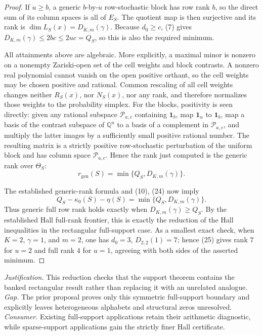 \documentclass{article}
\begin{document}
\begin{proof}
If \(u\ge b\), a generic \(b\)-by-\(u\) row-stochastic block has row rank
\(b\), so the direct sum of its column spaces is all of \(E_S\).  The quotient
map is then surjective and its rank is \(\dim L_S(x)=D_{K,m}(\gamma)\).  Because
\(d_0\ge c\), (7) gives \(D_{K,m}(\gamma)\le2bc\le2uc=Q_S\), so this is also
the required minimum.

All attainments above are algebraic.  More explicitly, a maximal minor is
nonzero on a nonempty Zariski-open set of the cell weights and block contrasts.
A nonzero real polynomial cannot vanish on the open positive orthant, so the
cell weights may be chosen positive and rational.  Common rescaling of all cell
weights changes neither \(R_S(x)\), nor \(N_S(x)\), nor any rank, and therefore
normalizes those weights to the probability simplex.  For the blocks, positivity
is seen directly: given any rational subspace \(\mathscr P_{a,c}\) containing
\(\mathbf 1_b\), map \(\mathbf 1_u\) to \(\mathbf 1_b\), map a basis of the
contrast subspace of \(\mathbb Q^u\) to a basis of a complement in
\(\mathscr P_{a,c}\), and multiply the latter images by a sufficiently small
positive rational number.  The resulting matrix is a strictly positive
row-stochastic perturbation of the uniform block and has column space
\(\mathscr P_{a,c}\).  Hence the rank just computed is the generic rank over
\(\Theta_S\):
\[
r_{\mathrm{gen}}(S)=\min\{Q_S,D_{K,m}(\gamma)\}.
\tag{24}
\]

The established generic-rank formula and (10), (24) now imply
\[
Q_S-\kappa_0(S)-\eta(S)
=\min\{Q_S,D_{K,m}(\gamma)\}.
\tag{25}
\]
Thus generic full row rank holds exactly when
\(D_{K,m}(\gamma)\ge Q_S\).  By the established Hall full-rank frontier, this is
exactly the reduction of the Hall inequalities in the rectangular full-support
case.  As a smallest exact check, when \(K=2\), \(\gamma=1\), and \(m=2\), one
has \(d_0=3\), \(D_{2,2}(1)=7\); hence (25) gives rank \(7\) for \(u=2\) and
full rank \(4\) for \(u=1\), agreeing with both sides of the asserted minimum.
\end{proof}
\par\smallskip\noindent \textit{Justification.} This reduction checks that the support theorem contains the banked rectangular result rather than replacing it with an unrelated analogue. \textit{Gap.} The prior proposal proves only this symmetric full-support boundary and explicitly leaves heterogeneous alphabets and structural zeros unresolved. \textit{Consumer.} Existing full-support applications retain their arithmetic diagnostic, while sparse-support applications gain the strictly finer Hall certificate.
\end{document}

